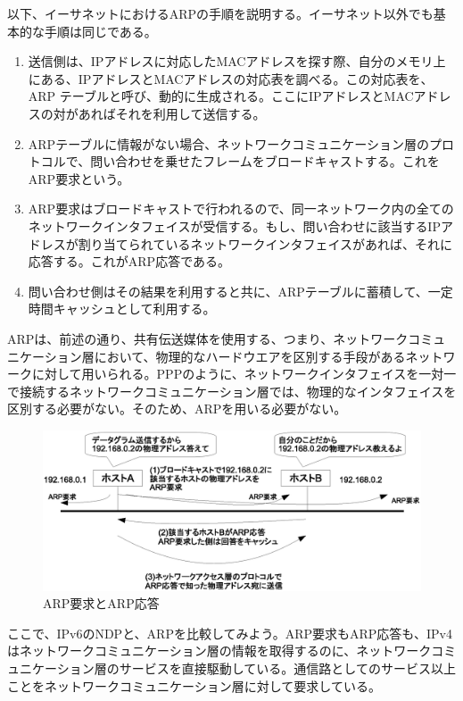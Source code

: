 以下、イーサネットにおけるARPの手順を説明する。イーサネット以外でも基本的な手順は同じである。

\begin{enumerate}
\item 送信側は、IPアドレスに対応したMACアドレスを探す際、自分のメモリ上にある、IPアドレスとMACアドレスの対応表を調べる。この対応表を、ARP テーブルと呼び、動的に生成される。ここにIPアドレスとMACアドレスの対があればそれを利用して送信する。
\item ARPテーブルに情報がない場合、ネットワークコミュニケーション層のプロトコルで、問い合わせを乗せたフレームをブロードキャストする。これをARP要求という。
\item ARP要求はブロードキャストで行われるので、同一ネットワーク内の全てのネットワークインタフェイスが受信する。もし、問い合わせに該当するIPアドレスが割り当てられているネットワークインタフェイスがあれば、それに応答する。これがARP応答である。
\item 問い合わせ側はその結果を利用すると共に、ARPテーブルに蓄積して、一定時間キャッシュとして利用する。
\end{enumerate}

ARPは、前述の通り、共有伝送媒体を使用する、つまり、ネットワークコミュニケーション層において、物理的なハードウエアを区別する手段があるネットワークに対して用いられる。PPPのように、ネットワークインタフェイスを一対一で接続するネットワークコミュニケーション層では、物理的なインタフェイスを区別する必要がない。そのため、ARPを用いる必要がない。

\begin{figure}[htbp]
	\includegraphics[width=12cm,clip]{draw/arp.eps}
	\caption{ARP要求とARP応答}
	\label{fig:arp}
\end{figure}

ここで、IPv6のNDPと、ARPを比較してみよう。ARP要求もARP応答も、IPv4はネットワークコミュニケーション層の情報を取得するのに、ネットワークコミュニケーション層のサービスを直接駆動している。通信路としてのサービス以上ことをネットワークコミュニケーション層に対して要求している。

